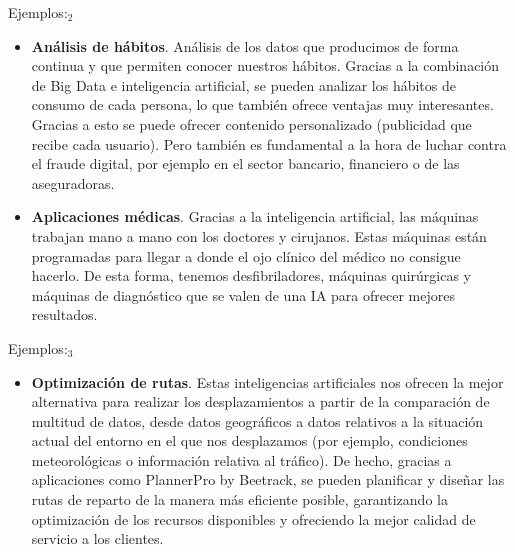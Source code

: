 \documentclass[11pt,aspectratio=169]{beamer}
\begin{document}
\begin{frame}{Ejemplos:$_2$}
    \begin{itemize}
        \item \textbf{Análisis de hábitos}.
            Análisis de los datos que producimos de forma continua y que permiten conocer nuestros hábitos. Gracias a la combinación de Big Data 
            e inteligencia artificial, se pueden analizar 	los hábitos de consumo de cada persona, lo que también ofrece ventajas muy interesantes. Gracias 
            a esto se puede ofrecer contenido personalizado (publicidad que recibe cada usuario). Pero también 
            es fundamental a la hora de luchar contra el fraude digital, por ejemplo en el sector bancario, financiero o de las aseguradoras. 
            
        \item \textbf{Aplicaciones médicas}.
            Gracias a la inteligencia artificial, las máquinas trabajan mano a mano con los doctores y cirujanos. Estas máquinas están programadas para llegar
            a donde el ojo clínico del médico no consigue hacerlo. De esta forma, tenemos desfibriladores, máquinas quirúrgicas y máquinas de diagnóstico que 
            se valen de una IA para ofrecer mejores resultados. 
    \end{itemize}
\end{frame}
    
\begin{frame}{Ejemplos:$_3$}
    \begin{itemize}
        \item \textbf{Optimización de rutas}.
            Estas inteligencias artificiales nos ofrecen la mejor alternativa para realizar los desplazamientos a partir de la 
            comparación de multitud de datos, desde datos geográficos a datos relativos a la situación actual del entorno en el que nos desplazamos (por ejemplo, 
            condiciones meteorológicas o información relativa al tráfico). De hecho, gracias a aplicaciones como PlannerPro by Beetrack, se pueden planificar y 
            diseñar las rutas de reparto de la manera más eficiente posible, garantizando la optimización de los recursos disponibles y ofreciendo la mejor calidad 
            de servicio a los clientes. 
    \end{itemize}
\end{frame}
\end{document}
